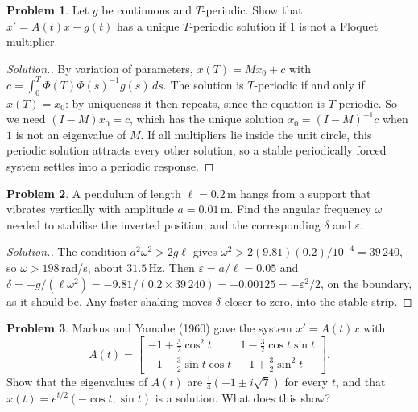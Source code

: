 \documentclass[11pt,a4paper]{article}
\numberwithin{equation}{section}
\theoremstyle{definition}
\newtheorem{problemx}{Problem}[subsection]
\newenvironment{problem}{\begin{problemx}}{\end{problemx}}
\newenvironment{solution}
  {\renewcommand{\qedsymbol}{}\begin{proof}[\textit{Solution}.]}
  {\end{proof}}
\begin{document}
\begin{problem}
\label{prob:periodicforcing}
Let $g$ be continuous and $T$-periodic. Show that $x' = A(t)x + g(t)$ has a unique $T$-periodic solution if $1$ is not a Floquet multiplier.
\end{problem}

\begin{solution}
By variation of parameters, $x(T) = Mx_0 + c$ with $c = \int_0^T\Phi(T)\Phi(s)^{-1}g(s)\,ds$. The solution is $T$-periodic if and only if $x(T) = x_0$: by uniqueness it then repeats, since the equation is
$T$-periodic. So we need $(I - M)x_0 = c$, which has the unique solution $x_0 = (I - M)^{-1}c$ when $1$ is not an eigenvalue of $M$. If all multipliers lie inside the unit circle, this periodic solution
attracts every other solution, so a stable periodically forced system settles into a periodic response.
\end{solution}

\begin{problem}
\label{prob:kapitzanum}
A pendulum of length $\ell = 0.2$\,m hangs from a support that vibrates vertically with amplitude $a = 0.01$\,m. Find the angular frequency $\omega$ needed to stabilise the inverted position,
and the corresponding $\delta$ and $\varepsilon$.
\end{problem}

\begin{solution}
The condition $a^2\omega^2 > 2g\ell$ gives $\omega^2 > 2(9.81)(0.2)/10^{-4} = 39\,240$, so $\omega > 198$\,rad/s, about $31.5$\,Hz. Then $\varepsilon = a/\ell = 0.05$ and $\delta = -g/(\ell\omega^2) = -9.81/(0.2 \times 39\,240) = -0.00125 = -\varepsilon^2/2$, on the
boundary, as it should be. Any faster shaking moves $\delta$ closer to zero, into the stable strip.
\end{solution}

\begin{problem}
\label{prob:markus}
Markus and Yamabe (1960) gave the system $x' = A(t)x$ with
\[
A(t) = \begin{bmatrix} -1 + \frac32\cos^2t & 1 - \frac32\cos t\sin t\\ -1 - \frac32\sin t\cos t & -1 + \frac32\sin^2t\end{bmatrix} .
\]
Show that the eigenvalues of $A(t)$ are $\frac14(-1 \pm i\sqrt7)$ for every $t$, and that $x(t) = e^{t/2}(-\cos t, \sin t)$ is a solution. What does this show?
\end{problem}
\end{document}
